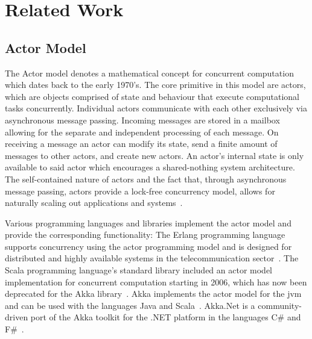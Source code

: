 
\section{Related Work}

  \subsection{Actor Model}
  The Actor model denotes a mathematical concept for concurrent computation which dates back to the early 1970's.
  The core primitive in this model are actors, which are objects comprised of state and behaviour that execute computational tasks concurrently.
  Individual actors communicate with each other exclusively via asynchronous message passing.
  Incoming messages are stored in a mailbox allowing for the separate and independent processing of each message.
  On receiving a message an actor can modify its state, send a finite amount of messages to other actors, and create new actors.
  An actor's internal state is only available to said actor which encourages a shared-nothing system architecture.
  The self-contained nature of actors and the fact that, through asynchronous message passing, actors provide a lock-free concurrency model, allows for naturally scaling out applications and systems~\cite{vernon2015reactive}.

  Various programming languages and libraries implement the actor model and provide the corresponding functionality:
  The Erlang programming language supports concurrency using the actor programming model and is designed for distributed and highly available systems in the telecommunication sector~\cite{armstrong:erlang}.
  The Scala programming language's standard library included an actor model implementation for concurrent computation starting in 2006, which has now been deprecated for the Akka library~\cite{Haller:2012}.
  Akka implements the actor model for the \gls{jvm} and can be used with the languages Java and Scala~\cite{akka}.
  Akka.Net is a community-driven port of the Akka toolkit for the .NET platform in the languages C\# and F\#~\cite{akka.net}.

